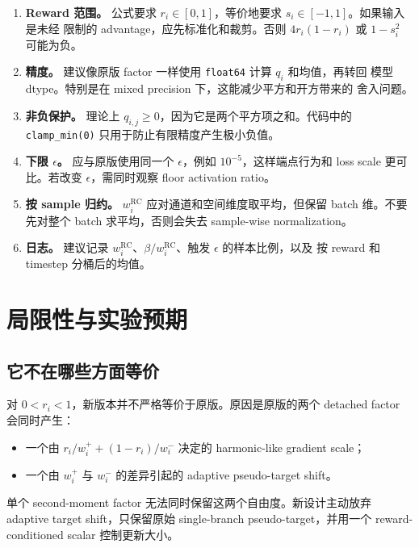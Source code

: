 \documentclass[11pt,a4paper]{article}
\newcommand{\eps}{\epsilon}
\newcommand{\R}{\mathrm{RC}}
\begin{document}
\begin{enumerate}
  \item \textbf{Reward 范围。}
  公式要求 $r_i\in[0,1]$，等价地要求 $s_i\in[-1,1]$。如果输入是未经
  限制的 advantage，应先标准化和裁剪。否则
  $4r_i(1-r_i)$ 或 $1-s_i^2$ 可能为负。

  \item \textbf{精度。}
  建议像原版 factor 一样使用 \texttt{float64} 计算 $q_i$ 和均值，再转回
  模型 dtype。特别是在 mixed precision 下，这能减少平方和开方带来的
  舍入问题。

  \item \textbf{非负保护。}
  理论上 $q_{i,j}\geq0$，因为它是两个平方项之和。代码中的
  \texttt{clamp\_min(0)} 只用于防止有限精度产生极小负值。

  \item \textbf{下限 $\eps$。}
  应与原版使用同一个 $\eps$，例如 $10^{-5}$，这样端点行为和 loss scale
  更可比。若改变 $\eps$，需同时观察 floor activation ratio。

  \item \textbf{按 sample 归约。}
  $w_i^{\R}$ 应对通道和空间维度取平均，但保留 batch 维。不要先对整个
  batch 求平均，否则会失去 sample-wise normalization。

  \item \textbf{日志。}
  建议记录 $w_i^{\R}$、$\beta/w_i^{\R}$、触发 $\eps$ 的样本比例，以及
  按 reward 和 timestep 分桶后的均值。
\end{enumerate}

\section{局限性与实验预期}

\subsection{它不在哪些方面等价}

对 $0<r_i<1$，新版本并不严格等价于原版。原因是原版的两个 detached
factor 会同时产生：
\begin{itemize}
  \item 一个由 $r_i/w_i^+ + (1-r_i)/w_i^-$ 决定的 harmonic-like
  gradient scale；
  \item 一个由 $w_i^+$ 与 $w_i^-$ 的差异引起的 adaptive pseudo-target
  shift。
\end{itemize}

单个 second-moment factor 无法同时保留这两个自由度。新设计主动放弃
adaptive target shift，只保留原始 single-branch pseudo-target，并用一个
reward-conditioned scalar 控制更新大小。
\end{document}
